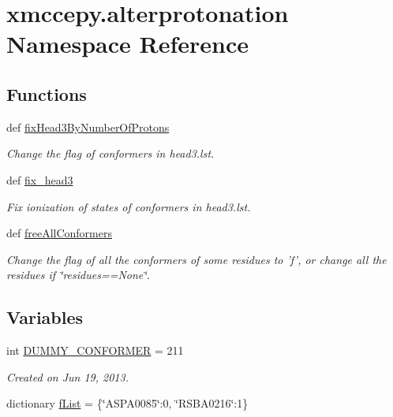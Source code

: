 \hypertarget{namespacexmccepy_1_1alterprotonation}{\section{xmccepy.\-alterprotonation Namespace Reference}
\label{namespacexmccepy_1_1alterprotonation}
}
\subsection*{Functions}
\begin{DoxyCompactItemize}
\item 
def \hyperlink{namespacexmccepy_1_1alterprotonation_acf77a8d136bdac2a7b8f06b4f651a037}{fix\-Head3\-By\-Number\-Of\-Protons}
\begin{DoxyCompactList}\small\item\em Change the flag of conformers in head3.\-lst. \end{DoxyCompactList}\item 
def \hyperlink{namespacexmccepy_1_1alterprotonation_aea4ef50139c2a1c5dbd5bf1b9ba952b0}{fix\-\_\-head3}
\begin{DoxyCompactList}\small\item\em Fix ionization of states of conformers in head3.\-lst. \end{DoxyCompactList}\item 
def \hyperlink{namespacexmccepy_1_1alterprotonation_ad9df210f9337aa35a83ab5f7e0bf66c6}{free\-All\-Conformers}
\begin{DoxyCompactList}\small\item\em Change the flag of all the conformers of some residues to 'f', or change all the residues if \char`\"{}residues==\-None\char`\"{}. \end{DoxyCompactList}\end{DoxyCompactItemize}
\subsection*{Variables}
\begin{DoxyCompactItemize}
\item 
int \hyperlink{namespacexmccepy_1_1alterprotonation_a59fb8a70cc51ae99c92ecf876479c879}{D\-U\-M\-M\-Y\-\_\-\-C\-O\-N\-F\-O\-R\-M\-E\-R} = 211
\begin{DoxyCompactList}\small\item\em Created on Jun 19, 2013. \end{DoxyCompactList}\item 
dictionary \hyperlink{namespacexmccepy_1_1alterprotonation_a21ca0b90681fab21533d9825b4e18a8b}{f\-List} = \{\char`\"{}A\-S\-P\-A0085\char`\"{}\-:0, \char`\"{}R\-S\-B\-A0216\char`\"{}\-:1\}
\end{DoxyCompactItemize}


